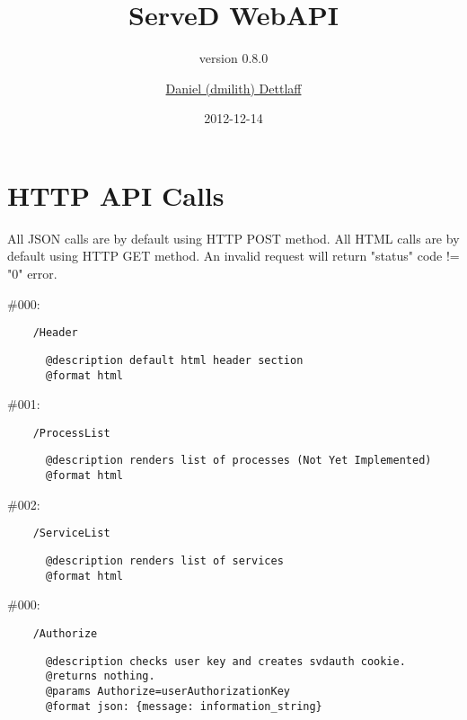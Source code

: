 \documentclass[11pt]{scrartcl}
\title{ServeD WebAPI}
\author{\href{mailto:dmilith@verknowsys.com}{Daniel (dmilith) Dettlaff}}
\subtitle{version 0.8.0}
\date{2012-12-14}
\begin{document}
\maketitle

\section{HTTP API Calls}\label{sec:apicalls}
  All JSON calls are by default using HTTP POST method.
  All HTML calls are by default using HTTP GET method.
  An invalid request will return "status" code != "0" error.

\begin{description}

  \item[GET API calls]

    \item \#000:
      \begin{verbatim}
    /Header
      \end{verbatim}
      \begin{verbatim}
      @description default html header section
      @format html
      \end{verbatim}

    \item \#001:
      \begin{verbatim}
    /ProcessList
      \end{verbatim}
      \begin{verbatim}
      @description renders list of processes (Not Yet Implemented)
      @format html
      \end{verbatim}

    \item \#002:
      \begin{verbatim}
    /ServiceList
      \end{verbatim}
      \begin{verbatim}
      @description renders list of services
      @format html
      \end{verbatim}




  \item[POST API calls]

    \item \#000:
      \begin{verbatim}
    /Authorize
      \end{verbatim}
      \begin{verbatim}
      @description checks user key and creates svdauth cookie.
      @returns nothing.
      @params Authorize=userAuthorizationKey
      @format json: {message: information_string}
      \end{verbatim}


\end{description}
\end{document}
